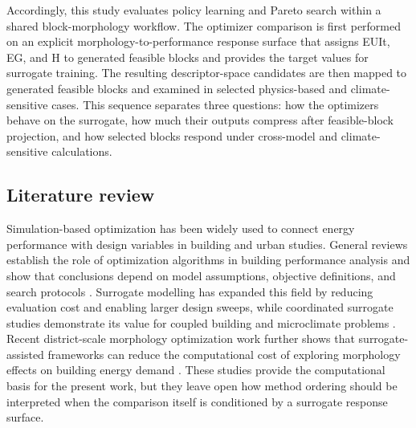 \documentclass[final,3p,times,numbers,sort&compress]{elsarticle}
\newif\ifshowrevision
\newenvironment{revblock}{%
  \ifshowrevision\color{revisionblue}\fi%
}{}
\begin{document}
\begin{revblock}
Accordingly, this study evaluates policy learning and Pareto search within a shared block-morphology workflow. The optimizer comparison is first performed on an explicit morphology-to-performance response surface that assigns EUIt, EG, and H to generated feasible blocks and provides the target values for surrogate training. The resulting descriptor-space candidates are then mapped to generated feasible blocks and examined in selected physics-based and climate-sensitive cases. This sequence separates three questions: how the optimizers behave on the surrogate, how much their outputs compress after feasible-block projection, and how selected blocks respond under cross-model and climate-sensitive calculations.

\subsection{Literature review}

Simulation-based optimization has been widely used to connect energy performance with design variables in building and urban studies. General reviews establish the role of optimization algorithms in building performance analysis and show that conclusions depend on model assumptions, objective definitions, and search protocols \cite{ref14,ref15}. Surrogate modelling has expanded this field by reducing evaluation cost and enabling larger design sweeps, while coordinated surrogate studies demonstrate its value for coupled building and microclimate problems \cite{ref19,ref20}. Recent district-scale morphology optimization work further shows that surrogate-assisted frameworks can reduce the computational cost of exploring morphology effects on building energy demand \cite{wang2026surrogateDistrictMorphology}. These studies provide the computational basis for the present work, but they leave open how method ordering should be interpreted when the comparison itself is conditioned by a surrogate response surface.


\end{revblock}
\end{document}
